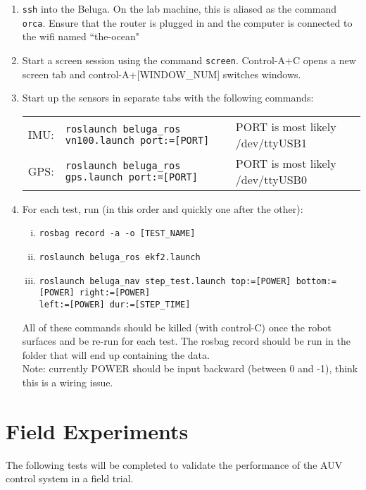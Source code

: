 \documentclass{article}
\begin{document}
\begin{enumerate}
\item{ \texttt{ssh} into the Beluga.
On the lab machine, this is aliased as the command \texttt{orca}.
Ensure that the router is plugged in and the computer is connected to the wifi named ``the-ocean"
}
\item{
Start a screen session using the command \texttt{screen}.
Control-A+C opens a new screen tab and control-A+[WINDOW\_NUM] switches windows.
}
\item{
Start up the sensors in separate tabs with the following commands: \vspace{-15pt}
\begin{center}
\begin{tabular}{lll}
IMU: & \texttt{roslaunch beluga\_ros vn100.launch port:=[PORT]} & PORT is most likely /dev/ttyUSB1 \\
GPS: & \texttt{roslaunch beluga\_ros gps.launch port:=[PORT]} & PORT is most likely /dev/ttyUSB0 \\
\end{tabular}
\end{center}
}
\item{
For each test, run (in this order and quickly one after the other):
\begin{enumerate}[i.]
\item \texttt{rosbag record -a -o [TEST\_NAME]}
\item \texttt{roslaunch beluga\_ros ekf2.launch}
\item \texttt{roslaunch beluga\_nav step\_test.launch top:=[POWER] bottom:=[POWER] right:=[POWER] \\ left:=[POWER] dur:=[STEP\_TIME]}
\end{enumerate}
All of these commands should be killed (with control-C) once the robot surfaces and be re-run for each test.
The rosbag record should be run in the folder that will end up containing the data. \\
Note: currently POWER should be input backward (between 0 and -1), think this is a wiring issue.
}
\end{enumerate}

\section*{Field Experiments}
The following tests will be completed to validate the performance of the AUV control system in a field trial.
\end{document}
